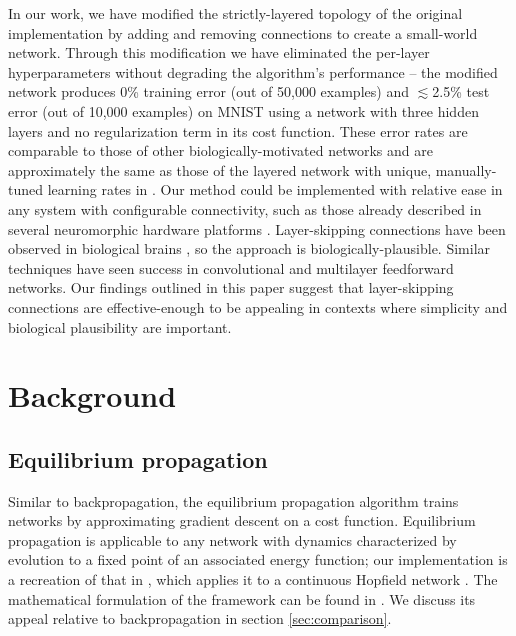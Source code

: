 \documentclass[utf8]{frontiersSCNS}
\begin{document}
In our work, we have modified the strictly-layered topology of the original implementation by adding and removing connections to create a small-world network\citep{watts98}. Through this modification we have eliminated the per-layer hyperparameters without degrading the algorithm's performance -- the modified network produces 0\% training error (out of 50,000 examples) and $\lesssim$2.5\% test error (out of 10,000 examples) on MNIST using a network with three hidden layers and no regularization term in its cost function. These error rates are comparable to those of other biologically-motivated networks \citep{bartunov2018} and are approximately the same as those of the layered network with unique, manually-tuned learning rates in \citep{scellier17}. Our method could be implemented with relative ease in any system with configurable connectivity, such as those already described in several neuromorphic hardware platforms \citep{davies2018, schemmel2010, shainline2019}. Layer-skipping connections have been observed in biological brains \citep{bullmore2009}, so the approach is biologically-plausible. Similar techniques have seen success in convolutional \citep{he2015, srivastava2015} and multilayer feedforward \citep{xiaohu2011, krishnan2019} networks. Our findings outlined in this paper suggest that layer-skipping connections are effective-enough to be appealing in contexts where simplicity and biological plausibility are important.

\section{Background}

\subsection{Equilibrium propagation}
\label{sec:eqp_formulation}

Similar to backpropagation, the equilibrium propagation algorithm \citep{scellier17} trains networks by approximating gradient descent on a cost function. Equilibrium propagation is applicable to any network with dynamics characterized by evolution to a fixed point of an associated energy function; our implementation is a recreation of that in \citep{scellier17}, which applies it to a continuous Hopfield network \citep{hopfield1984}. The mathematical formulation of the framework can be found in \citep{scellier17}. We discuss its appeal relative to backpropagation in section \ref{sec:comparison}.
\end{document}
